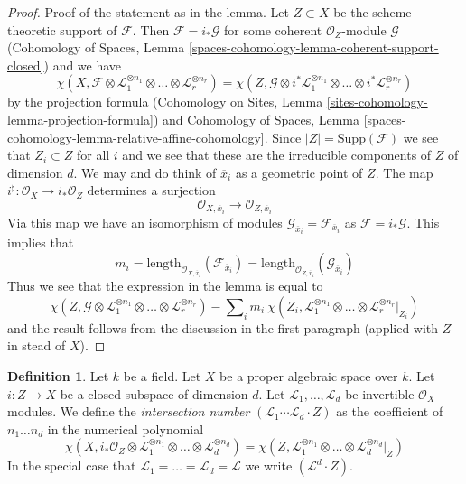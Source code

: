 \documentclass{stacks-project}
\theoremstyle{plain}
\theoremstyle{definition}
\newtheorem{definition}[subsection]{Definition}
\theoremstyle{remark}
\numberwithin{equation}{subsection}
\begin{document}
\begin{proof}
\medskip\noindent
Proof of the statement as in the lemma.
Let $Z \subset X$ be the scheme theoretic support of $\mathcal{F}$.
Then $\mathcal{F} = i_*\mathcal{G}$ for some coherent
$\mathcal{O}_Z$-module $\mathcal{G}$
(Cohomology of Spaces, Lemma
\ref{spaces-cohomology-lemma-coherent-support-closed})
and we have
$$
\chi(X, \mathcal{F} \otimes
\mathcal{L}_1^{\otimes n_1} \otimes \ldots \otimes
\mathcal{L}_r^{\otimes n_r}) =
\chi(Z, \mathcal{G} \otimes
i^*\mathcal{L}_1^{\otimes n_1} \otimes \ldots \otimes
i^*\mathcal{L}_r^{\otimes n_r})
$$
by the projection formula
(Cohomology on Sites, Lemma \ref{sites-cohomology-lemma-projection-formula})
and Cohomology of Spaces, Lemma
\ref{spaces-cohomology-lemma-relative-affine-cohomology}.
Since $|Z| = \text{Supp}(\mathcal{F})$ we see that $Z_i \subset Z$
for all $i$ and we see that these are the irreducible components
of $Z$ of dimension $d$. We may and do think of $\overline{x}_i$
as a geometric point of $Z$. The map
$i^\sharp : \mathcal{O}_X \to i_*\mathcal{O}_Z$
determines a surjection
$$
\mathcal{O}_{X, \overline{x}_i} \to \mathcal{O}_{Z, \overline{x}_i}
$$
Via this map we have an isomorphism of modules
$\mathcal{G}_{\overline{x}_i} = \mathcal{F}_{\overline{x}_i}$
as $\mathcal{F} = i_*\mathcal{G}$. This implies that
$$
m_i = \text{length}_{\mathcal{O}_{X, \overline{x}_i}}
(\mathcal{F}_{\overline{x}_i}) =
\text{length}_{\mathcal{O}_{Z, \overline{x}_i}}
(\mathcal{G}_{\overline{x}_i})
$$
Thus we see that the expression in the lemma is equal to
$$
\chi(Z, \mathcal{G} \otimes \mathcal{L}_1^{\otimes n_1} \otimes \ldots \otimes
\mathcal{L}_r^{\otimes n_r}) -
\sum\nolimits_i
m_i\ \chi(Z_i, \mathcal{L}_1^{\otimes n_1} \otimes \ldots \otimes
\mathcal{L}_r^{\otimes n_r}|_{Z_i})
$$
and the result follows from the discussion in the first paragraph
(applied with $Z$ in stead of $X$).
\end{proof}

\begin{definition}
\label{definition-intersection-number}
Let $k$ be a field. Let $X$ be a proper algebraic space over $k$. Let
$i : Z \to X$ be a closed subspace of dimension $d$. Let
$\mathcal{L}_1, \ldots, \mathcal{L}_d$ be invertible
$\mathcal{O}_X$-modules. We define the {\it intersection number}
$(\mathcal{L}_1 \cdots \mathcal{L}_d \cdot Z)$
as the coefficient of $n_1 \ldots n_d$ in the numerical polynomial
$$
\chi(X, i_*\mathcal{O}_Z \otimes \mathcal{L}_1^{\otimes n_1} \otimes
\ldots \otimes \mathcal{L}_d^{\otimes n_d}) =
\chi(Z, \mathcal{L}_1^{\otimes n_1} \otimes
\ldots \otimes \mathcal{L}_d^{\otimes n_d}|_Z)
$$
In the special
case that $\mathcal{L}_1 = \ldots = \mathcal{L}_d = \mathcal{L}$
we write $(\mathcal{L}^d \cdot Z)$.
\end{definition}
\end{document}
